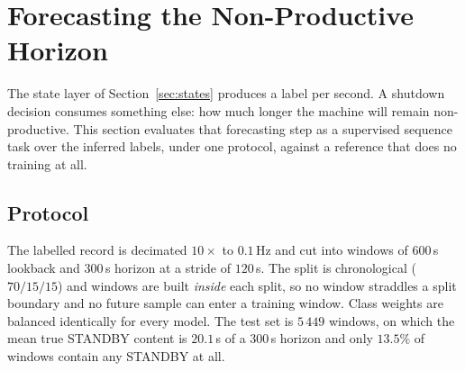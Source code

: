 %
%
%

\section{Forecasting the Non-Productive Horizon}
\label{sec:forecasting}

The state layer of Section~\ref{sec:states} produces a label per second.
A shutdown decision consumes something else: how much longer the machine
will remain non-productive. This section evaluates that forecasting step
as a supervised sequence task over the inferred labels, under one
protocol, against a reference that does no training at all.

\subsection{Protocol}
\label{sec:forecasting:protocol}

The labelled record is decimated $10\times$ to $0.1$\,Hz and cut into
windows of $600$\,s lookback and $300$\,s horizon at a stride of
$120$\,s. The split is chronological ($70/15/15$) and windows are built
\emph{inside} each split, so no window straddles a split boundary and no
future sample can enter a training window. Class weights are balanced
identically for every model. The test set is $5\,449$ windows, on which
the mean true STANDBY content is $20.1$\,s of a $300$\,s horizon and
only $13.5\%$ of windows contain any STANDBY at all.

